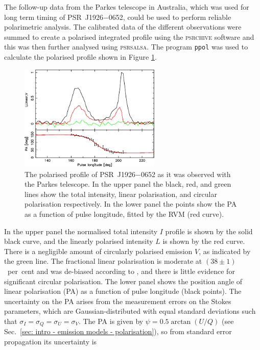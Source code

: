 The follow-up data from the Parkes telescope in Australia, which was used for long term timing of PSR~J1926$-$0652, could be used to perform reliable polarimetric analysis. The calibrated data of the different observations were summed to create a polarised integrated profile using the \textsc{psrchive} software \citep{HSMx2004} and this was then further analysed using \textsc{psrsalsa}. The program \texttt{ppol} was used to calculate the polarised profile shown in Figure \ref{fig: J1926 - parkes profile}.
\begin{figure}
    \begin{center}
        \includegraphics[width=0.6\textwidth]{Figures/J1926/parkes_profile}
        \caption[The polarised profile as observed with Parkes]{The polarised profile of PSR~J1926$-$0652 as it was observed with the Parkes telescope. In the upper panel the black, red, and green lines show the total intensity, linear polarisation, and circular polarisation respectively. In the lower panel the points show the PA as a function of pulse longitude, fitted by the RVM (red curve).}
        \label{fig: J1926 - parkes profile}
    \end{center}
\end{figure}
In the upper panel the normalised total intensity $I$ profile is shown by the solid black curve, and the linearly polarised intensity $L$ is shown by the red curve. There is a negligible amount of circularly polarised emission $V$, as indicated by the green line. The fractional linear polarisation is moderate at $(38\pm1)$~per~cent and was de-biased according to \citet{WKxx1974}, and there is little evidence for significant circular polarisation. The lower panel shows the position angle of linear polarisation (PA) as a function of pulse longitude (black points). The uncertainty on the PA arises from the measurement errors on the Stokes parameters, which are Gaussian-distributed with equal standard deviations such that $\sigma_I = \sigma_Q = \sigma_U = \sigma_V$. The PA is given by $\psi = 0.5\arctan(U/Q)$ (see Sec.~\ref{sec: intro - emission models - polarisation}), so from standard error propagation its uncertainty is
